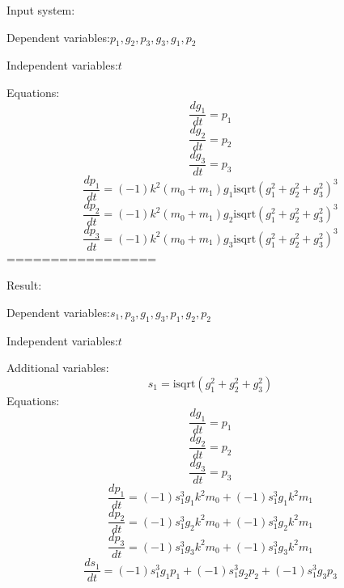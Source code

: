 \documentclass[10pt,a4paper]{article}
\begin{document}
Input system:

Dependent variables:$p_{1}, g_{2}, p_{3}, g_{3}, g_{1}, p_{2}$

Independent variables:$t$

Equations:
\begin{dmath*}\frac{dg_{1}}{dt} = p_{1}\end{dmath*}
\begin{dmath*}\frac{dg_{2}}{dt} = p_{2}\end{dmath*}
\begin{dmath*}\frac{dg_{3}}{dt} = p_{3}\end{dmath*}
\begin{dmath*}\frac{dp_{1}}{dt} = \left(-1\right)  k ^ {2}  \left(m_{0} + m_{1}\right)  g_{1}  \text{isqrt}\left(g_{1} ^ {2} + g_{2} ^ {2} + g_{3} ^ {2}\right) ^ {3}\end{dmath*}
\begin{dmath*}\frac{dp_{2}}{dt} = \left(-1\right)  k ^ {2}  \left(m_{0} + m_{1}\right)  g_{2}  \text{isqrt}\left(g_{1} ^ {2} + g_{2} ^ {2} + g_{3} ^ {2}\right) ^ {3}\end{dmath*}
\begin{dmath*}\frac{dp_{3}}{dt} = \left(-1\right)  k ^ {2}  \left(m_{0} + m_{1}\right)  g_{3}  \text{isqrt}\left(g_{1} ^ {2} + g_{2} ^ {2} + g_{3} ^ {2}\right) ^ {3}\end{dmath*}
=================

Result:

Dependent variables:$s_{1}, p_{3}, g_{1}, g_{3}, p_{1}, g_{2}, p_{2}$

Independent variables:$t$

Additional variables:
\begin{dmath*}s_{1} = \text{isqrt}\left(g_{1} ^ {2} + g_{2} ^ {2} + g_{3} ^ {2}\right)\end{dmath*}
Equations:
\begin{dmath*}\frac{dg_{1}}{dt} = p_{1}\end{dmath*}
\begin{dmath*}\frac{dg_{2}}{dt} = p_{2}\end{dmath*}
\begin{dmath*}\frac{dg_{3}}{dt} = p_{3}\end{dmath*}
\begin{dmath*}\frac{dp_{1}}{dt} = \left(-1\right)  s_{1} ^ {3}  g_{1}  k ^ {2}  m_{0} + \left(-1\right)  s_{1} ^ {3}  g_{1}  k ^ {2}  m_{1}\end{dmath*}
\begin{dmath*}\frac{dp_{2}}{dt} = \left(-1\right)  s_{1} ^ {3}  g_{2}  k ^ {2}  m_{0} + \left(-1\right)  s_{1} ^ {3}  g_{2}  k ^ {2}  m_{1}\end{dmath*}
\begin{dmath*}\frac{dp_{3}}{dt} = \left(-1\right)  s_{1} ^ {3}  g_{3}  k ^ {2}  m_{0} + \left(-1\right)  s_{1} ^ {3}  g_{3}  k ^ {2}  m_{1}\end{dmath*}
\begin{dmath*}\frac{ds_{1}}{dt} = \left(-1\right)  s_{1} ^ {3}  g_{1}  p_{1} + \left(-1\right)  s_{1} ^ {3}  g_{2}  p_{2} + \left(-1\right)  s_{1} ^ {3}  g_{3}  p_{3}\end{dmath*}
\end{document}
